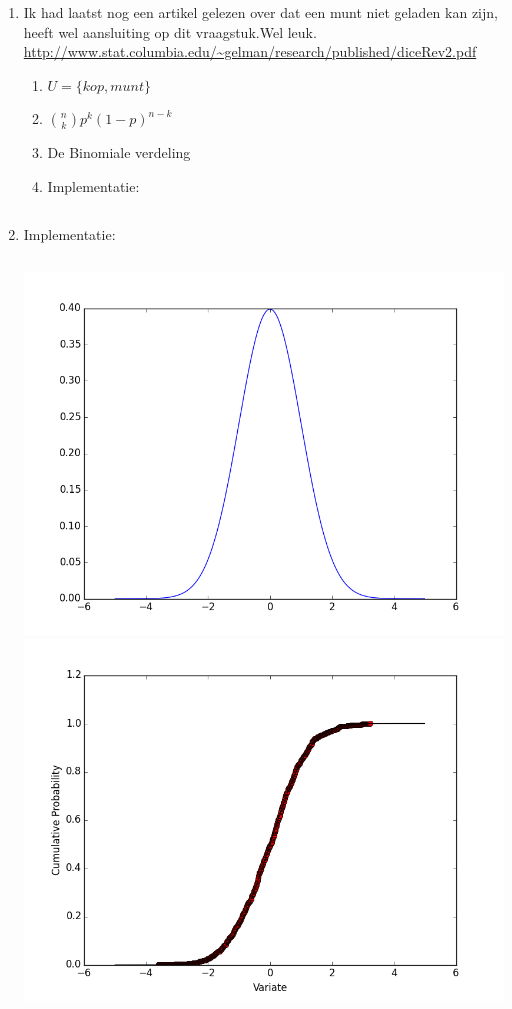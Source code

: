 \documentclass[pdftex,12pt,a4paper]{article}
\begin{document}
\begin{enumerate}
    \item
    	Ik had laatst nog een artikel gelezen over dat een munt niet geladen kan zijn, heeft wel aansluiting op dit
    	vraagstuk.Wel leuk.\\
    	\url{http://www.stat.columbia.edu/~gelman/research/published/diceRev2.pdf}
        \begin{enumerate}
            \item
                $U=\{kop, munt\}$
            \item
                ${n \choose k} p^k(1-p)^{n-k}$
            \item
            	De Binomiale verdeling
            \item
            	Implementatie:\\
            	\inputminted{python}{2.2d.py}
        \end{enumerate}
   	\newpage
	\item
    	Implementatie:
    	\inputminted{python}{3.py}
    	\includegraphics[width=\linewidth]{3}
    	\includegraphics[width=\linewidth]{3_cum}
\end{enumerate}
\end{document}
